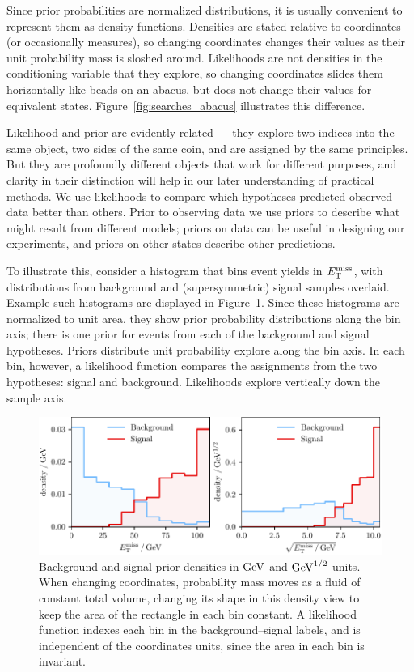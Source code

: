 Since prior probabilities are normalized distributions, it is usually
convenient to represent them as density functions.
Densities are stated relative to coordinates (or occasionally measures),
so changing coordinates changes their values as their unit probability mass
is sloshed around.
Likelihoods are not densities in the conditioning variable that they explore,
so changing coordinates slides them horizontally like beads on an abacus,
but does not change their values for equivalent states.
Figure~\ref{fig:searches_abacus} illustrates this difference.

Likelihood and prior are evidently related --- they explore two indices into
the same object, two sides of the same coin, and are assigned by the same
principles.
But they are profoundly different objects that work for different purposes,
and clarity in their distinction will help in our later understanding of
practical methods.
We use likelihoods to compare which hypotheses predicted observed data better
than others.
Prior to observing data we use priors to describe what might result from
different models; priors on data can be useful in designing our experiments,
and priors on other states describe other predictions.

To illustrate this, consider a histogram that bins event yields in
$\met$, with distributions from background and (supersymmetric) signal samples
overlaid.
Example such histograms are displayed in
Figure~\ref{fig:searches_sig_bkg_prior_likelihood}.
Since these histograms are normalized to unit area, they show prior
probability distributions along the bin axis; there is one prior
for events from each of the background and signal hypotheses.
Priors distribute unit probability explore along the bin axis.
In each bin, however, a likelihood function compares the assignments from
the two hypotheses: signal and background.
Likelihoods explore vertically down the sample axis.

\begin{figure}[tp]
\centering
\includegraphics[width=\textwidth]{figures/searches_sig_bkg_prior_likelihood.pdf}
\caption[
Background and signal prior densities
]{%
Background and signal prior densities in $\eV[G]$ and $\eV[G]^{1/2}$ units.
When changing coordinates, probability mass moves as a fluid of constant total
volume, changing its shape in this density view to keep the area of the
rectangle in each bin constant.
A likelihood function indexes each bin in the background--signal labels,
and is independent of the coordinates units, since the area in each bin is
invariant.
}
\label{fig:searches_sig_bkg_prior_likelihood}
\end{figure}

